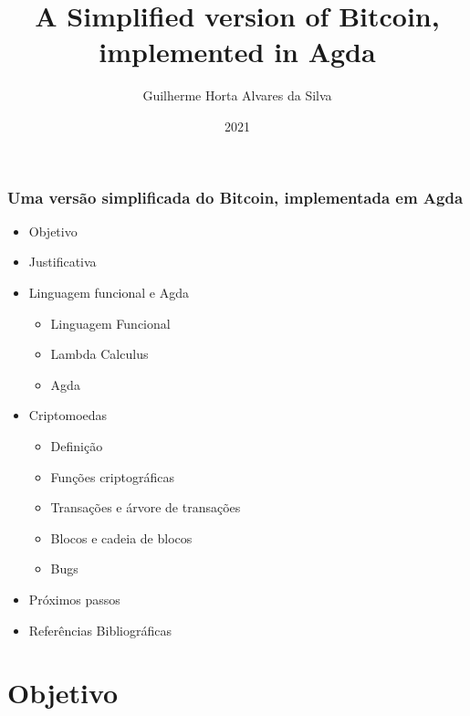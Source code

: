 \documentclass{beamer}
\title{A Simplified version of Bitcoin, \\
    implemented in Agda}
\author[Guilherme]{Guilherme Horta Alvares da Silva}
\date{2021}
\begin{document}
\frame{\titlepage}

\begin{frame}
  \frametitle{Uma versão simplificada do Bitcoin, implementada em Agda}
\begin{itemize}
  \item Objetivo
  \item Justificativa
  \item Linguagem funcional e Agda
  \begin{itemize}
    \item Linguagem Funcional
    \item Lambda Calculus
    \item Agda
  \end{itemize}
  \item Criptomoedas
  \begin{itemize}
    \item Definição
    \item Funções criptográficas
    \item Transações e árvore de transações
    \item Blocos e cadeia de blocos
    \item Bugs
  \end{itemize}
  \item Próximos passos
  \item Referências Bibliográficas
\end{itemize}
\end{frame}

\section{Objetivo}
\end{document}
